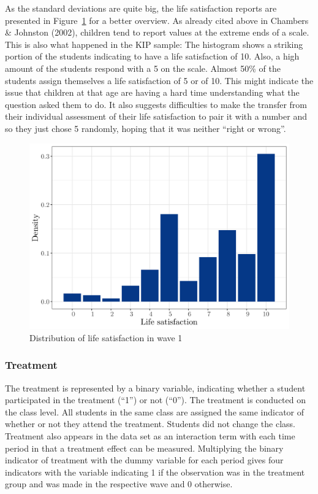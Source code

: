 \documentclass[a4, 12pt]{article}
\begin{document}
As the standard deviations are quite big, the life satisfaction reports are presented in Figure~\ref{fig:hist-lsat} for a better overview. As already cited above in Chambers \& Johnston (2002), children tend to report values at the extreme ends of a scale. This is also what happened in the KIP sample: The histogram shows a striking portion of the students indicating to have a life satisfaction of 10. Also, a high amount of the students respond with a 5 on the scale. Almost 50\% of the students assign themselves a life satisfaction of 5 or of 10. This might indicate the issue that children at that age are having a hard time understanding what the question asked them to do. It also suggests difficulties to make the transfer from their individual assessment of their life satisfaction to pair it with a number and so they just chose 5 randomly, hoping that it was neither ``right or wrong''.

\begin{figure}[H]

{\centering \includegraphics[width=0.8\linewidth,]{../figures/lsat_bar} 

}

\caption{Distribution of life satisfaction in wave 1}\label{fig:hist-lsat}
\end{figure}

\hypertarget{treatment}{%
\subsubsection{Treatment}\label{treatment}}

The treatment is represented by a binary variable, indicating whether a student participated in the treatment (``1'') or not (``0''). The treatment is conducted on the class level. All students in the same class are assigned the same indicator of whether or not they attend the treatment. Students did not change the class. Treatment also appears in the data set as an interaction term with each time period in that a treatment effect can be measured. Multiplying the binary indicator of treatment with the dummy variable for each period gives four indicators with the variable indicating 1 if the observation was in the treatment group and was made in the respective wave and 0 otherwise.
\end{document}
